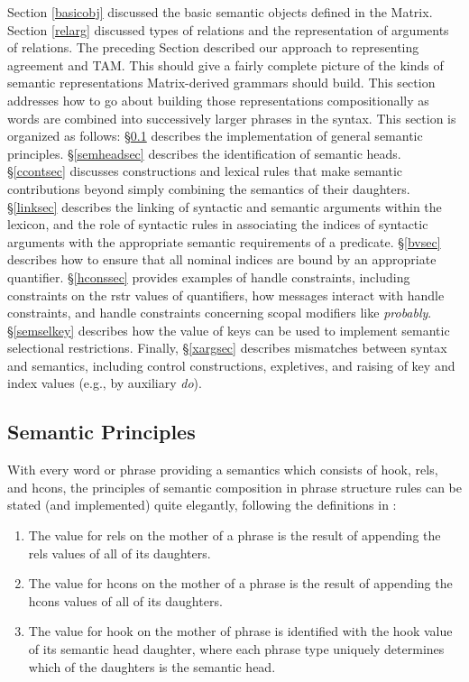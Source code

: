 \documentclass[12pt]{article}
\begin{document}
Section \ref{basicobj} discussed the basic semantic objects defined
in the Matrix.  Section \ref{relarg} discussed types of relations
and the representation of arguments of relations.  The preceding
Section described our approach to representing agreement and TAM.
This should give a fairly complete picture of the kinds of semantic
representations Matrix-derived grammars should build.  This section
addresses how to go about building those representations
compositionally as words are combined into successively larger phrases
in the syntax.  This section is organized as follows:
\S\ref{semprinsec} describes the implementation of general semantic
principles. \S\ref{semheadsec} describes the identification of
semantic heads.  \S\ref{ccontsec} discusses constructions and lexical
rules that make semantic contributions beyond simply combining the
semantics of their daughters.  \S\ref{linksec} describes the linking
of syntactic and semantic arguments within the lexicon, and the
role of syntactic rules in associating the indices of syntactic
arguments with the appropriate semantic requirements of a predicate.
\S\ref{bvsec} describes how to ensure that all nominal indices are
bound by an appropriate quantifier.  \S\ref{hconssec} provides
examples of handle constraints, including constraints on the {\sc
rstr} values of quantifiers, how messages interact with handle
constraints, and handle constraints concerning scopal modifiers like
{\it probably}.  \S\ref{semselkey} describes how the value of {\sc
keys} can be used to implement semantic selectional restrictions.
Finally, \S\ref{xargsec} describes mismatches between syntax and
semantics, including control constructions, expletives, and
raising of {\sc key} and {\sc index} values (e.g., by auxiliary 
{\it do}).

\subsection{Semantic Principles}
\label{semprinsec}

With every word or phrase providing a semantics which consists of {\sc
hook}, {\sc rels}, and {\sc hcons}, the principles of semantic
composition in phrase structure rules can be stated (and implemented)
quite elegantly, following the definitions in :

\begin{enumerate}
\item The value for {\sc rels} on the mother of a phrase is the result of
appending the {\sc rels} values of all of its daughters.
\item The value for {\sc hcons} on the mother of a phrase is the result of
appending the {\sc hcons} values of all of its daughters.
\item The value for {\sc hook} on the mother of phrase is identified with
the {\sc hook} value of its semantic head daughter, where each phrase type
uniquely determines which of the daughters is the semantic head.
\end{enumerate}
\end{document}
